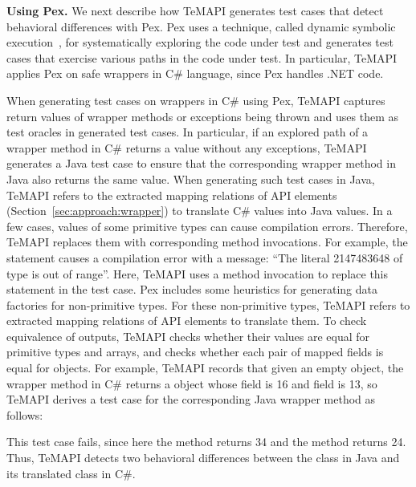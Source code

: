 \textbf{Using Pex.} We next describe how TeMAPI generates test cases that detect behavioral differences with Pex. Pex uses a technique, called dynamic symbolic execution~\citep{koushik:cute, godefroid:dart}, for systematically exploring the code under test and generates test cases that exercise various paths in the code under test. In particular, TeMAPI applies Pex on safe wrappers in C\# language, since Pex handles .NET code.

When generating test cases on wrappers in C\# using Pex, TeMAPI captures return values of wrapper methods or exceptions being thrown and uses them as test oracles in generated test cases. In particular, if an explored path of a wrapper method in C\# returns a value without any exceptions, TeMAPI generates a Java test case to ensure that the corresponding wrapper method in Java also returns the same value. When generating such test cases in Java, TeMAPI refers to the extracted mapping relations of API elements (Section~\ref{sec:approach:wrapper}) to translate C\# values into Java values. In a few cases, values of some primitive types can cause compilation errors. Therefore, TeMAPI replaces them with corresponding method invocations. For example, the  statement causes a compilation error with a message: ``The literal 2147483648 of type  is out of range''. Here, TeMAPI uses a method invocation to replace this statement in the  test case. Pex includes some heuristics for generating data factories for non-primitive types. For these non-primitive types, TeMAPI refers to extracted mapping relations of API elements to translate them. To check equivalence of outputs, TeMAPI checks whether their values are equal for primitive types and arrays, and checks whether each pair of mapped fields is equal for objects. For example, TeMAPI records that given an empty object, the  wrapper method in C\# returns a  object whose  field is 16 and  field is 13, so TeMAPI derives a test case for the corresponding Java wrapper method as follows:



This test case fails, since here the  method returns 34 and the  method returns 24. Thus, TeMAPI detects two behavioral differences between the  class in Java and its translated class in C\#.


